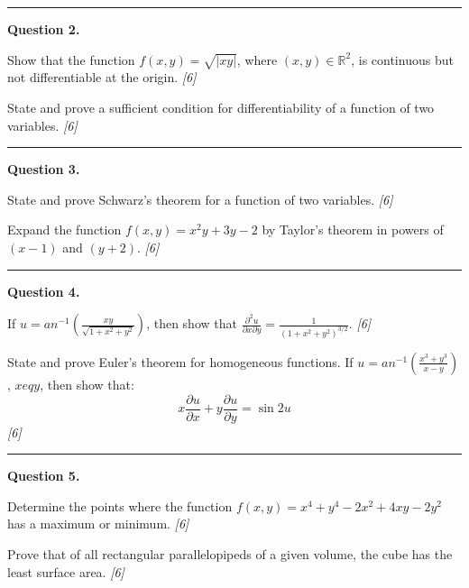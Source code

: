\documentclass[11pt,a4paper]{article}
\newcommand{\pts}[1]{\hfill   \textit{[#1]}}
\begin{document}
\medskip\rule{\linewidth}{0.2pt}

\medskip


\noindent   \textbf{Question 2.}

\begin{parts}
  \item Show that the function $f(x, y) = \sqrt{|xy|}$, where $(x, y) \in \mathbb{R}^2$, is continuous but not differentiable at the origin. \pts{6}
  \item State and prove a sufficient condition for differentiability of a function of two variables. \pts{6}
\end{parts}

\medskip\rule{\linewidth}{0.2pt}

\medskip


\noindent   \textbf{Question 3.}

\begin{parts}
  \item State and prove Schwarz's theorem for a function of two variables. \pts{6}
  \item Expand the function $f(x, y) = x^2y + 3y - 2$ by Taylor's theorem in powers of $(x - 1)$ and $(y + 2)$. \pts{6}
\end{parts}

\medskip\rule{\linewidth}{0.2pt}

\medskip


\noindent   \textbf{Question 4.}

\begin{parts}
  \item If $u =  an^{-1}\left( \frac{xy}{\sqrt{1+x^2+y^2}} \right)$, then show that $\frac{\partial^2 u}{\partial x \partial y} = \frac{1}{(1+x^2+y^2)^{3/2}}$. \pts{6}
  \item State and prove Euler's theorem for homogeneous functions. If $u =  an^{-1}\left( \frac{x^3+y^3}{x-y} \right)$, $x 
eq y$, then show that:
  \[
  x \frac{\partial u}{\partial x} + y \frac{\partial u}{\partial y} = \sin 2u
  \] \pts{6}
\end{parts}

\medskip\rule{\linewidth}{0.2pt}

\medskip


\noindent   \textbf{Question 5.}

\begin{parts}
  \item Determine the points where the function $f(x, y) = x^4 + y^4 - 2x^2 + 4xy - 2y^2$ has a maximum or minimum. \pts{6}
  \item Prove that of all rectangular parallelopipeds of a given volume, the cube has the least surface area. \pts{6}
\end{parts}
\end{document}
